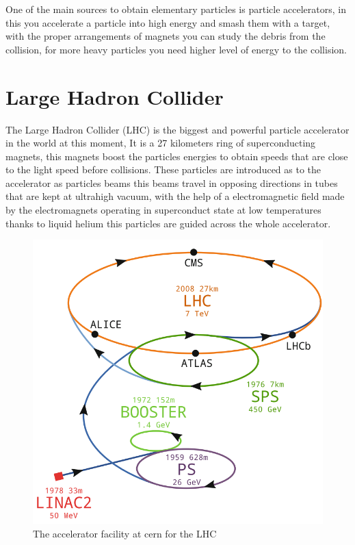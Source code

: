 One of the main sources to obtain elementary particles is particle accelerators, in this you accelerate a particle into high energy and smash them with a target, with the proper  arrangements of magnets you can study the debris from the collision, for more heavy particles you need higher level of energy to the collision.

\section{Large Hadron Collider}

The Large Hadron Collider (LHC) is the biggest and powerful particle accelerator in the world at this moment, It is a 27 kilometers ring of superconducting magnets, this magnets boost the particles energies to obtain speeds that are close to the light speed before collisions. These particles are introduced as to the accelerator as particles beams this beams travel in opposing directions in tubes that are kept at ultrahigh vacuum, with the help of a electromagnetic field made by the electromagnets operating in superconduct state at low temperatures thanks to liquid helium this particles are guided across the whole accelerator. \cite{LHC}


\begin{figure}[h]
    \centering
   \includegraphics[width=1\textwidth]{LHC.png}
    \caption{The accelerator facility at cern for the LHC}
    \label{fig:LHC}
\end{figure}




